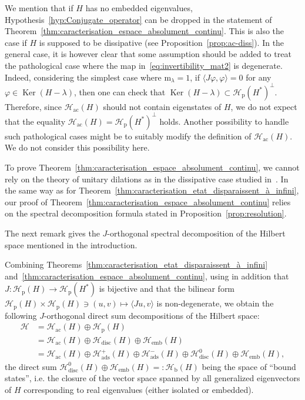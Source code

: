 \documentclass[AHL,Unicode,longabstracts,published]{cedram}
\newcommand{\Hi}{\mathcal{H}}
\newcommand{\rmp}{\mathrm{p}}
\newcommand{\acr}{\mathrm{ac}}
\newcommand{\ads}{\mathrm{ads}}
\newcommand{\rmb}{\mathrm{b}}
\newcommand{\rmm}{\mathrm{m}}
\newcommand{\disc}{\mathrm{disc}}
\DeclareMathOperator{\Ker}{Ker}
\newcommand{\Hi}{\mathcal{H}}
\newcommand{\rmp}{\mathrm{p}}
\newcommand{\acr}{\mathrm{ac}}
\begin{document}
We mention that if $H$ has no embedded eigenvalues, Hypothesis~\ref{hyp:Conjugate_operator} can be dropped in the statement of Theorem~\ref{thm:caracterisation_espace_absolument_continu}. This is also the case if $H$ is supposed to be dissipative (see Proposition~\ref{prop:ac-diss}). In the general case, it is however clear that some assumption should be added to treat the pathological case where the map in~\eqref{eq:invertibility_mat2} is degenerate. Indeed, considering the simplest case where $\rmm_\lambda=1$, if $\langle J\varphi,\varphi\rangle=0$ for any $\varphi\in\Ker(H-\lambda)$, then one can check that $\Ker(H-\lambda)\subset\Hi_{\rmp}(H^*)^\perp$. Therefore, since $\Hi_\acr(H)$ should not contain eigenstates of $H$, we do not expect that the equality $\Hi_\acr(H)=\Hi_\rmp(H^*)^\perp$ holds. Another possibility to handle such pathological cases might be to suitably modify the definition of $\Hi_\acr(H)$. We do not consider this possibility here.

To prove Theorem~\ref{thm:caracterisation_espace_absolument_continu}, we cannot rely on the theory of unitary dilations as in the dissipative case studied in~\cite{Da80_01}. In the same way as for Theorem~\ref{thm:caracterisation_etat_disparaissent_à_infini}, our proof of Theorem~\ref{thm:caracterisation_espace_absolument_continu} relies on the spectral decomposition formula stated in Proposition~\ref{prop:resolution}.


The next remark gives the $J$-orthogonal spectral decomposition of the Hilbert space mentioned in the introduction.

\begin{rema}
Combining Theorems~\ref{thm:caracterisation_etat_disparaissent_à_infini} and~\ref{thm:caracterisation_espace_absolument_continu}, using in addition that $J:\Hi_{\rmp}(H)\to\Hi_{\rmp}(H^*)$ is bijective and that the bilinear form $\mathcal{H}_{\mathrm{p}}(H)\times\mathcal{H}_{\mathrm{p}}(H) \ni (u,v)\mapsto \langle Ju,v\rangle$ is non-degenerate, we obtain the following $J$-orthogonal direct sum decompositions of the Hilbert space:
\begin{align*}
\Hi &= \Hi_{\acr}(H) \oplus \Hi_{\rmp}(H) \\
&= \Hi_{\acr}(H) \oplus \Hi_{\disc}(H)\oplus\Hi_{\mathrm{emb}}(H) \\
&= \Hi_{\acr}(H) \oplus \Hi_{\ads}^+(H)\oplus\Hi_{\ads}^-(H)\oplus\Hi_{\disc}^0(H)\oplus\Hi_{\mathrm{emb}}(H),
\end{align*}
the direct sum $\Hi_{\disc}^0(H)\oplus\Hi_{\mathrm{emb}}(H)=:\Hi_{\rmb}(H)$ being the space of ``bound states'', i.e. the closure of the vector space spanned by all generalized eigenvectors of $H$ corresponding to real eigenvalues (either isolated or embedded).
\end{rema}
\end{document}
